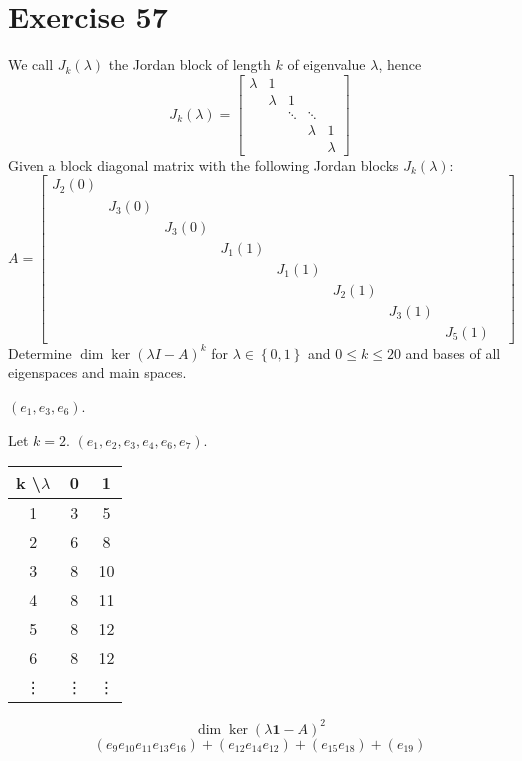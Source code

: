 \documentclass[a4paper]{article}
\theoremstyle{definition}
\newcommand\set[1]{\left\{#1\right\}}
\begin{document}
\section{Exercise 57}
\begin{ex}
  We call $J_k(\lambda)$ the Jordan block of length $k$ of eigenvalue $\lambda$, hence
  \[ J_k(\lambda) = \begin{bmatrix} \lambda & 1 & & & \\ & \lambda & 1 & & \\ & & \ddots & \ddots & \\ & & & \lambda & 1 \\ & & & & \lambda \end{bmatrix} \]
  Given a block diagonal matrix with the following Jordan blocks $J_k(\lambda)$:
  \[
    A = \begin{bmatrix}
      J_2(0) & & & & & & & & \\
      & J_3(0) & & & & & & & \\
      & & J_3(0) & & & & & & \\
      & & & J_1(1) & & & & & \\
      & & & & J_1(1) & & & & \\
      & & & & & J_2(1) & & & \\
      & & & & & & J_3(1) & & \\
      & & & & & & & J_5(1) &
    \end{bmatrix}
  \]
  Determine $\dim\ker(\lambda I - A)^k$ for $\lambda \in \set{0,1}$ and $0 \leq k \leq 20$ and bases of all eigenspaces and main spaces.
\end{ex}

$(e_1, e_3, e_6)$.

Let $k = 2$. $(e_1, e_2, e_3, e_4, e_6, e_7)$.

\begin{tabular}{ccc}
  k \textbackslash $\lambda$ & 0 & 1 \\
\hline
  1 & 3 & 5 \\
  2 & 6 & 8 \\
  3 & 8 & 10 \\
  4 & 8 & 11 \\
  5 & 8 & 12 \\
  6 & 8 & 12 \\
  \vdots & \vdots & \vdots
\end{tabular}

\[ \dim\ker(\lambda \mathbf 1 - A)^2 \]
\[ (e_9 e_{10} e_{11} e_{13} e_{16}) + (e_{12} e_{14} e_{12}) + (e_{15} e_{18}) + (e_{19}) \]
\end{document}

